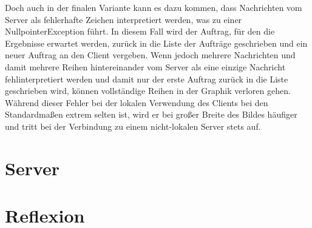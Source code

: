 \documentclass[12pt, onecolumn,notitlepage]{scrartcl}
\begin{document}
Doch auch in der finalen Variante kann es dazu kommen, dass Nachrichten vom Server als fehlerhafte Zeichen interpretiert werden, was zu einer NullpointerException führt. In diesem Fall wird der Auftrag, für den die Ergebnisse erwartet werden, zurück in die Liste der Aufträge geschrieben und ein neuer Auftrag an den Client vergeben. Wenn jedoch mehrere Nachrichten und damit mehrere Reihen hintereinander vom Server als eine einzige Nachricht fehlinterpretiert werden und damit nur der erste Auftrag zurück in die Liste geschrieben wird, können vollständige Reihen in der Graphik verloren gehen. Während dieser Fehler bei der lokalen Verwendung des Clients bei den Standardmaßen extrem selten ist, wird er bei großer Breite des Bildes häufiger und tritt bei der Verbindung zu einem nicht-lokalen Server stets auf.


\section{Server}


\section{Reflexion}


\nocite{*}
\end{document}
